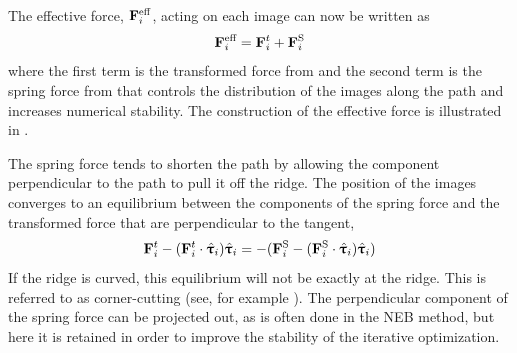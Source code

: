 The effective force, ${\mathrm{\mathbf{\bm{F}}}}_i^\text{eff}$, acting on each image can now be written as
\begin{equation}
{\ensuremath{\mathrm{\mathbf{\bm{F}}}}}_i^\text{eff} = {\mathrm{\mathbf{\bm{F}}}}_i^t + {\mathrm{\mathbf{\bm{F}}}}_i^\text{S}
\label{eq:effective-force}
\end{equation}
where the first term is the transformed force from %
and the %
second term is the spring force from  that controls the distribution of the images along the path and increases numerical stability.
The construction of the effective force is illustrated in .

The spring force tends to shorten the path by allowing the component perpendicular to the path to pull it off the ridge.
The position of the images converges to an equilibrium between the components of the spring force and the transformed force that are perpendicular to the tangent,
\begin{equation}
{\ensuremath{\mathrm{\mathbf{\bm{F}}}}}^t_i - ({\mathrm{\mathbf{\bm{F}}}}^t_i \cdot \hat{{\mathrm{\mathbf{\bm{\uptau}}}}}_i)\hat{{\mathrm{\mathbf{\bm{\uptau}}}}}_i = - ({\mathrm{\mathbf{\bm{F}}}}^\text{S}_i - ({\mathrm{\mathbf{\bm{F}}}}^\text{S}_i \cdot \hat{{\mathrm{\mathbf{\bm{\uptau}}}}}_i)\hat{{\mathrm{\mathbf{\bm{\uptau}}}}}_i)
\end{equation}
If the ridge is curved, this equilibrium will not be exactly at the ridge.
This is referred to as corner-cutting (see, for example \cite{neb-original-1998}).
The perpendicular component of the spring force can be projected out, as is often done in the NEB method, but here it is retained in order to improve the stability of the iterative optimization.

